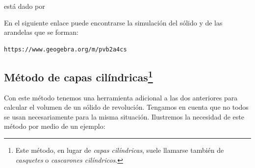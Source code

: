 
está dado por



En el siguiente enlace puede encontrarse la simulación del sólido y de las arandelas que se forman:


\begin{center}
	\verb"https://www.geogebra.org/m/pvb2a4cs"
\end{center}




\subsection*{Método de capas cilíndricas\protect\footnote{Este método, en lugar de \textit{capas cilíndricas}, suele llamarse también de \textit{casquetes} o \textit{cascarones cilíndricos}.}}

Con este método tenemos una herramienta adicional a las dos anteriores para calcular el volumen de un sólido de revolución. Tengamos en cuenta que no todos se usan necesariamente para la misma situación. Ilustremos la necesidad de este método por medio de un ejemplo:


